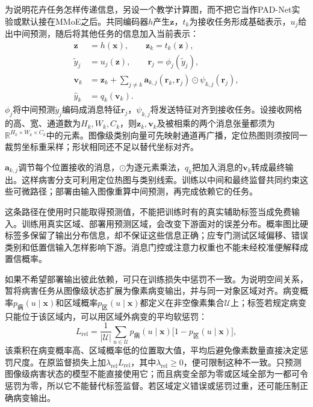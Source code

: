 为说明花卉任务怎样传递信息，另设一个教学计算图，而不把它当作PAD-Net实验或默认接在MMoE之后。共同编码器$h$产生$\bm z$，$t_k$为接收任务形成基础表示，$u_j$给出中间预测，随后将其他任务的信息加入当前表示：
\begin{align}
  \bm z&=h(\bm x),
  \qquad \bm z_k=t_k(\bm z),
  \nonumber\\
  \widetilde y_j&=u_j(\bm z),
  \qquad
  \bm r_j=\phi_j(\widetilde y_j),
  \nonumber\\
  \bm v_k&=\bm z_k+
     \sum_{j\ne k}
     \bm a_{k,j}(\bm r_k,\bm r_j)
       \odot\psi_{k,j}(\bm r_j),
  \nonumber\\
  \hat y_k&=q_k(\bm v_k).
  \label{eq:ket-sharing-output-message}
\end{align}
$\phi_j$将中间预测$\widetilde y_j$编码成消息特征$\bm r_j$，$\psi_{k,j}$将发送特征对齐到接收任务。设接收网格的高、宽、通道数为$H_k,W_k,C_k$，则$\bm z_k,\bm v_k$及被相乘的两个消息张量都须为$\mathbb R^{H_k\times W_k\times C_k}$中的元素。图像级类别向量可先映射通道再广播，定位热图则须按同一裁剪坐标重采样；形状相同还不足以替代坐标对齐。

$\bm a_{k,j}$调节每个位置接收的消息，$\odot$为逐元素乘法，$q_k$把加入消息的$\bm v_k$转成最终输出。这样病害分支可利用定位热图与类别线索。训练以中间和最终监督共同约束这些可微路径；部署由输入图像重算中间预测，再完成依赖它的任务。

这条路径在使用时只能取得预测值，不能把训练时有的真实辅助标签当成免费输入。训练用真实区域、部署用预测区域，会改变下游面对的误差分布。概率图比硬标签多保留了输出分布信息，却不保证这些信息正确；应专门测试区域偏移、错误类别和低置信输入怎样影响下游。消息门控或注意力权重也不能未经校准便解释成置信概率。

如果不希望部署输出彼此依赖，可只在训练损失中惩罚不一致。为说明空间关系，暂将病害任务从图像级状态扩展为像素病变输出，并与同一对象区域对齐。病变概率$p_{\text{病}}(u\mid\bm x)$和区域概率$p_{\text{区}}(u\mid\bm x)$都定义在非空像素集合$\mathcal U$上；标签若规定病变只能位于该区域内，可以用区域外病变的平均软惩罚：
\begin{equation}
  L_{\mathrm{rel}}
  =\frac{1}{|\mathcal U|}
    \sum_{u\in\mathcal U}
    p_{\text{病}}(u\mid\bm x)
    \bigl[1-p_{\text{区}}(u\mid\bm x)\bigr],
  \label{eq:ket-sharing-output-constraint}
\end{equation}
该乘积在病变概率高、区域概率低的位置取大值，平均后避免像素数量直接决定惩罚尺度。在原监督损失上加$\lambda_{\mathrm{rel}}L_{\mathrm{rel}}$，其中$\lambda_{\mathrm{rel}}\geq0$，便可限制这种不一致。只预测图像级病害状态的模型不能直接使用它；而且病变全部为零或区域全部为一都可令惩罚为零，所以它不能替代标签监督。若区域定义错误或惩罚过重，还可能压制正确病变输出。

